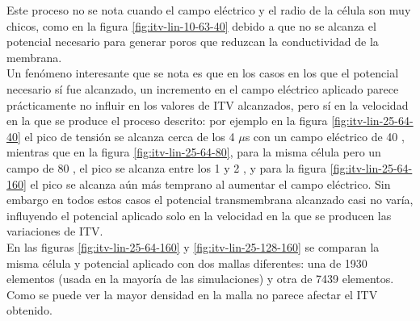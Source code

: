 \documentclass[a4paper,10pt]{article}
\begin{document}
Este proceso no se nota cuando el campo eléctrico y el radio de la célula son muy chicos, como en la figura \ref{fig:itv-lin-10-63-40} debido a que no se alcanza el potencial necesario para generar poros que reduzcan la conductividad de la membrana.\\

Un fenómeno interesante que se nota es que en los casos en los que el potencial necesario sí fue alcanzado, un incremento en el campo eléctrico aplicado parece prácticamente no influir en los valores de ITV alcanzados, pero sí en la velocidad en la que se produce el proceso descrito: por ejemplo en la figura \ref{fig:itv-lin-25-64-40} el pico de tensión se alcanza cerca de los 4 $\mu$s con un campo eléctrico de 40 \kvm, mientras que en la figura \ref{fig:itv-lin-25-64-80}, para la misma célula pero un campo de 80 \kvm, el pico se alcanza entre los 1 y 2 \usec, y para la figura \ref{fig:itv-lin-25-64-160} el pico se alcanza aún más temprano al aumentar el campo eléctrico. Sin embargo en todos estos casos el potencial transmembrana alcanzado casi no varía, influyendo el potencial aplicado solo en la velocidad en la que se producen las variaciones de ITV.\\

En las figuras \ref{fig:itv-lin-25-64-160} y \ref{fig:itv-lin-25-128-160} se comparan la misma célula y potencial aplicado con dos mallas diferentes: una de 1930 elementos (usada en la mayoría de las simulaciones) y otra de 7439 elementos.  Como se puede ver la mayor densidad en la malla no parece afectar el ITV obtenido.

\clearpage

%
%

%		
\end{document}
